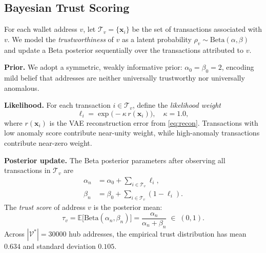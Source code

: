 \subsection{Bayesian Trust Scoring}
\label{subsec:trust}

\begin{definition}
\label{def:trust}
For each wallet address $v$, let
$\mathcal{T}_{v} = \{\mathbf{x}_{i}\}$ be the set of transactions
associated with $v$.
We model the \emph{trustworthiness} of $v$ as a latent probability
$\rho_{v}\sim\mathrm{Beta}(\alpha,\beta)$ and update a Beta posterior
sequentially over the transactions attributed to $v$.
\end{definition}

\noindent\textbf{Prior.}
We adopt a symmetric, weakly informative prior:
$\alpha_{0} = \beta_{0} = 2$, encoding mild belief that addresses are
neither universally trustworthy nor universally anomalous.

\noindent\textbf{Likelihood.}
For each transaction $i\in\mathcal{T}_{v}$, define the \emph{likelihood
weight}
\begin{equation}
  \ell_{i}
    = \exp\!\bigl(-\kappa\,r(\mathbf{x}_{i})\bigr),
  \quad \kappa = 1.0,
  \label{eq:likelihood}
\end{equation}
where $r(\mathbf{x}_{i})$ is the VAE reconstruction error from
\eqref{eq:recon}.  Transactions with low anomaly score contribute near-unity
weight, while high-anomaly transactions contribute near-zero weight.

\noindent\textbf{Posterior update.}
The Beta posterior parameters after observing all transactions in
$\mathcal{T}_{v}$ are
\begin{align}
  \alpha_{n} &= \alpha_{0} + \textstyle\sum_{i\in\mathcal{T}_{v}} \ell_{i},
  \label{eq:alpha_n} \\
  \beta_{n}  &= \beta_{0}  + \textstyle\sum_{i\in\mathcal{T}_{v}} (1 - \ell_{i}).
  \label{eq:beta_n}
\end{align}
The \emph{trust score} of address $v$ is the posterior mean:
\begin{equation}
  \tau_{v}
    = \mathbb{E}\!\bigl[\mathrm{Beta}(\alpha_{n},\beta_{n})\bigr]
    = \frac{\alpha_{n}}{\alpha_{n} + \beta_{n}}
    \;\in\; (0,1).
  \label{eq:trust}
\end{equation}
Across $|\mathcal{V}^{*}|=\num{30000}$ hub addresses, the empirical trust
distribution has mean $0.634$ and standard deviation $0.105$.

